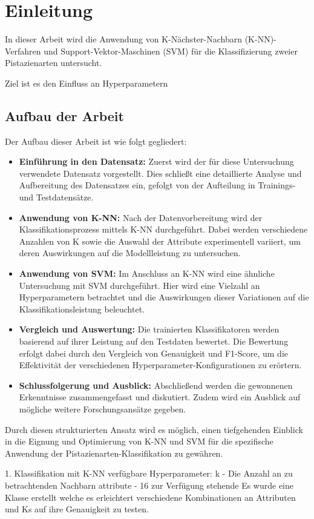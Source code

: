 
\section{Einleitung}
In dieser Arbeit wird die Anwendung von K-Nächster-Nachbarn (K-NN)-Verfahren und Support-Vektor-Maschinen (SVM) für die Klassifizierung zweier Pistazienarten untersucht. 

Ziel ist es den Einfluss an Hyperparametern 

\subsection*{Aufbau der Arbeit}

Der Aufbau dieser Arbeit ist wie folgt gegliedert:

\begin{itemize}
	\item \textbf{Einführung in den Datensatz:} Zuerst wird der für diese Untersuchung verwendete Datensatz vorgestellt. Dies schließt eine detaillierte Analyse und Aufbereitung des Datensatzes ein, gefolgt von der Aufteilung in Trainings- und Testdatensätze.
	\item \textbf{Anwendung von K-NN:} Nach der Datenvorbereitung wird der Klassifikationsprozess mittels K-NN durchgeführt. Dabei werden verschiedene Anzahlen von \glqq{}K\grqq{} sowie die Auswahl der Attribute experimentell variiert, um deren Auswirkungen auf die Modellleistung zu untersuchen.
	\item \textbf{Anwendung von SVM:} Im Anschluss an K-NN wird eine ähnliche Untersuchung mit SVM durchgeführt. Hier wird eine Vielzahl an Hyperparametern betrachtet und die Auswirkungen dieser Variationen auf die Klassifikationsleistung beleuchtet.
	\item \textbf{Vergleich und Auswertung:} Die trainierten Klassifikatoren werden basierend auf ihrer Leistung auf den Testdaten bewertet. Die Bewertung erfolgt dabei durch den Vergleich von Genauigkeit und F1-Score, um die Effektivität der verschiedenen Hyperparameter-Konfigurationen zu erörtern.
	\item \textbf{Schlussfolgerung und Ausblick:} Abschließend werden die gewonnenen Erkenntnisse zusammengefasst und diskutiert. Zudem wird ein Ausblick auf mögliche weitere Forschungsansätze gegeben.
\end{itemize}

Durch diesen strukturierten Ansatz wird es möglich, einen tiefgehenden Einblick in die Eignung und Optimierung von K-NN und SVM für die spezifische Anwendung der Pistazienarten-Klassifikation zu gewähren.




1. Klassifikation mit K-NN
verfügbare Hyperparameter:
 k - Die Anzahl an zu betrachtenden Nachbarn
 attribute - 16 zur Verfügung stehende
Es wurde eine Klasse erstellt welche es erleichtert verschiedene Kombinationen an Attributen und Ks auf ihre Genauigkeit zu testen. 
